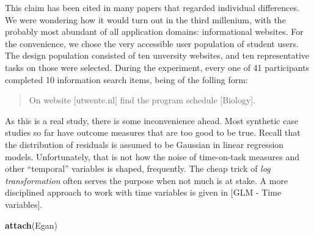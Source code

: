 \documentclass[]{svmono}
\newenvironment{Shaded}{\begin{snugshade}}{\end{snugshade}}
\newcommand{\KeywordTok}[1]{\textcolor[rgb]{0.13,0.29,0.53}{\textbf{#1}}}
\newcommand{\DataTypeTok}[1]{\textcolor[rgb]{0.13,0.29,0.53}{#1}}
\newcommand{\StringTok}[1]{\textcolor[rgb]{0.31,0.60,0.02}{#1}}
\newcommand{\OperatorTok}[1]{\textcolor[rgb]{0.81,0.36,0.00}{\textbf{#1}}}
\newcommand{\NormalTok}[1]{#1}
\theoremstyle{definition}
\theoremstyle{definition}
\theoremstyle{definition}
\theoremstyle{remark}
\begin{document}
This claim has been cited in many papers that regarded individual
differences. We were wondering how it would turn out in the third
millenium, with the probably most abundant of all application domains:
informational websites. For the convenience, we chose the very
accessible user population of student users. The design population
consisted of ten unversity websites, and ten representative tasks on
those were selected. During the experiment, every one of 41 participants
completed 10 information search items, being of the folling form:

\begin{quote}
On website {[}utwente.nl{]} find the program schedule {[}Biology{]}.
\end{quote}

As this is a real study, there is some inconvenience ahead. Most
synthetic case studies so far have outcome measures that are too good to
be true. Recall that the distribution of residuals is assumed to be
Gaussian in linear regression models. Unfortunately, that is not how the
noise of time-on-task measures and other ``temporal'' variables is
shaped, frequently. The cheap trick of \emph{log transformation} often
serves the purpose when not much is at stake. A more disciplined
approach to work with time variables is given in {[}GLM - Time
variables{]}.

\begin{Shaded}
\begin{Highlighting}[]
\KeywordTok{attach}\NormalTok{(Egan)}
\end{Highlighting}
\end{Shaded}

\begin{Shaded}
\end{Shaded}
\end{document}
